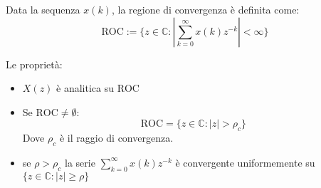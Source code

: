 \begin{definition}
  Data la sequenza $x(k)$, la regione di convergenza è definita come:
  \begin{equation}
  \text{ROC} := \{ z \in \mathbb{C} : | \sum_{k=0}^{\infty} x(k)z^{-k} | < \infty \}
  \end{equation}
\end{definition}


Le proprietà:
\begin{itemize}
  \item $X(z)$ è analitica su $\text{ROC}$
  \item Se $\text{ROC} \neq \emptyset$:
    \begin{equation}
      \text{ROC} = \{ z \in \mathbb{C} : |z| > \rho_c \}
    \end{equation}
    Dove $\rho_c$ è il raggio di convergenza.

  \item se $\rho > \rho_c$ la serie $\sum_{k=0}^{\infty} x(k)z^{-k}$ è convergente
  uniformemente su $\{ z \in \mathbb{C} : | z | \geq \rho \}$
\end{itemize}



